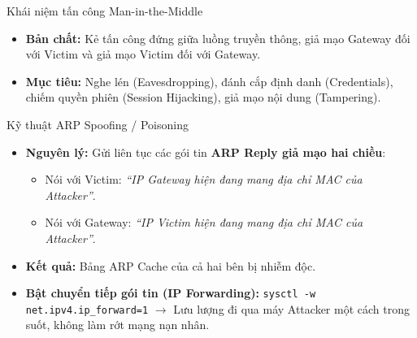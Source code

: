 \documentclass[fleqn]{beamer}
\begin{document}
\begin{frame}{Khái niệm tấn công Man-in-the-Middle}
  \begin{center}
  \end{center}
  \begin{itemize}
    \item \textbf{Bản chất:} Kẻ tấn công đứng giữa luồng truyền thông, giả mạo Gateway đối với Victim và giả mạo Victim đối với Gateway.
    \item \textbf{Mục tiêu:} Nghe lén (Eavesdropping), đánh cắp định danh (Credentials), chiếm quyền phiên (Session Hijacking), giả mạo nội dung (Tampering).
  \end{itemize}
\end{frame}

\begin{frame}{Kỹ thuật ARP Spoofing / Poisoning}
  \begin{itemize}
    \item \textbf{Nguyên lý:} Gửi liên tục các gói tin \textbf{ARP Reply giả mạo hai chiều}:
      \begin{itemize}
        \item Nói với Victim: \textit{``IP Gateway hiện đang mang địa chỉ MAC của Attacker''}.
        \item Nói với Gateway: \textit{``IP Victim hiện đang mang địa chỉ MAC của Attacker''}.
      \end{itemize}
    \item \textbf{Kết quả:} Bảng ARP Cache của cả hai bên bị nhiễm độc.
    \item \textbf{Bật chuyển tiếp gói tin (IP Forwarding):}
      \texttt{sysctl -w net.ipv4.ip\_forward=1} $\rightarrow$ Lưu lượng đi qua máy Attacker một cách trong suốt, không làm rớt mạng nạn nhân.
  \end{itemize}
\end{frame}
\end{document}

